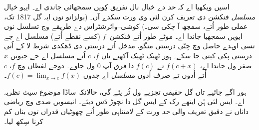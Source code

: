 \documentclass[../../../include/open-logic-section]{subfiles}
\begin{document}
اسیں ویکھیا اے کہ \emph{حد} دے خیال نال تفریق کِویں سمجھائی جاندی اے۔ ایہو خیال \emph{مسلسل} فنکشن دی تعریف کرن لئی وی ورت سکدے آں۔ (بولزانو نوں ایہ گل 1817 تک، عملی طور اُتے، سمجھ آ چکی سی۔) کوشی--وائرشٹراس دے طریقے وچ تسلسل نوں ایویں سمجھیا جاندا اے۔ موٹے طور اُتے فنکشن~$f$ (کسے نقطے اُتے) مسلسل اے جے تسی اوہدے حاصل وچ جِنّی درستی منگو، مدخل اُتے درستی دی ڈھکدی شرط لا کے اُنی درستی پکی کیتی جا سکے۔ ہور ٹھیک ٹھیک آکھیے تاں $f$، $c$ اُتے مسلسل اے جے جیویں $x$ صفر ول جاندا اے، $f(c + x)$ تے $f(c)$ دا فرق آپ $0$ ول جاوے۔ دوجے لفظاں وچ $f$، $c$ اُتے اُدوں تے صرف اُدوں \emph{مسلسل} اے جدوں $f(c) = \lim_{x \rightarrow c} f(x)$۔

ہور اگے جائیے تاں گل حقیقی تجزیے ول ٹُر پئے گی، حالانکہ ساڈا موضوع سیٹ نظریہ اے۔ ایس لئی ہُن ایتھے رک کے ایس گل دا نچوڑ دَس دیئے۔ انیسویں صدی وچ ریاضی داناں نے دقیق تعریف والی \emph{حد} ورت کے لامتناہی طور اُتے چھوٹیاں قدراں توں بناں کم کرنا سِکھ لیا۔
\end{document}
